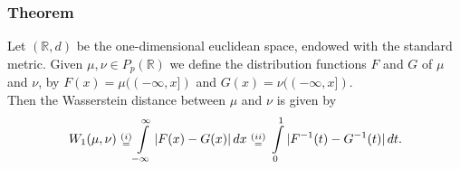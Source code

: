 \documentclass[11pt,a4paper]{article}
\begin{document}
\subsubsection{Theorem}
Let $(\mathbb{R},d)$ be the one-dimensional euclidean space, endowed with the standard metric. Given $\mu,\nu\in{}P_p(\mathbb{R})$ we define the distribution functions $F$ and $G$ of $\mu$ and $\nu$, by $F(x)=\mu((-\infty,x])$ and $G(x)=\nu((-\infty,x])$. \vspace{1em}\\Then the Wasserstein distance between $\mu$ and $\nu$ is given by
\[
W_1(\mu,\nu)\hspace{0.3em} \substack{(i)\\=} \int\limits_{-\infty}^{\infty}|F(x)-G(x)|\,dx\hspace{0.3em}\substack{(ii)\\=}\hspace{0.3em} \int\limits_{0}^{1}|F^{-1}(t)-G^{-1}(t)|\,dt. 
\]
\end{document}
